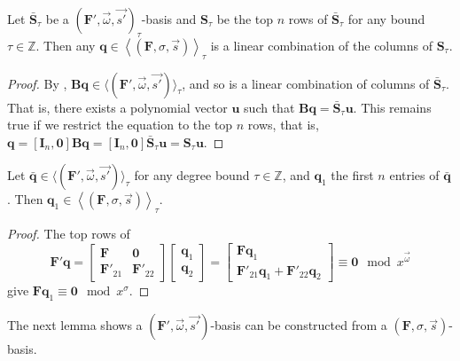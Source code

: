 \begin{cor}
\label{cor:linearCombinationOfFirstnRows}Let $\bar{\mathbf{S}}_{\tau}$
be a $(\mathbf{F}',\vec{\omega},\vec{s'})_{\tau}$-basis and $\mathbf{S}_{\tau}$
be the top $n$ rows of $\bar{\mathbf{S}}_{\tau}$ for any bound $\tau\in\mathbb{Z}$.
Then any $\mathbf{q}\in\left\langle \left(\mathbf{F},\sigma,\vec{s}\right)\right\rangle _{\tau}$
is a linear combination of the columns of $\mathbf{S}_{\tau}$.\end{cor}
\begin{proof}
By , $\mathbf{B}\mathbf{q}\in\langle(\mathbf{F}',\vec{\omega},\vec{s'})\rangle_{\tau}$,
and so is a linear combination of columns of $\bar{\mathbf{S}}_{\tau}$.
That is, there exists a polynomial vector $\mathbf{u}$ such that
$\mathbf{B}\mathbf{q}=\bar{\mathbf{S}}_{\tau}\mathbf{u}$. This remains
true if we restrict the equation to the top $n$ rows, that is, $\mathbf{q}=\left[\mathbf{I}_{n},\mathbf{0}\right]\mathbf{B}\mathbf{q}=\left[\mathbf{I}_{n},\mathbf{0}\right]\bar{\mathbf{S}}_{\tau}\mathbf{u}=\mathbf{S}_{\tau}\mathbf{u}$.\end{proof}
\begin{lem}
\label{lem:bqToqOrder}Let $\bar{\mathbf{q}}\in\langle(\mathbf{F}',\vec{\omega},\vec{s'})\rangle_{\tau}$
for any degree bound $\tau\in\mathbb{Z}$, and $\mathbf{q}_{1}$ the
first $n$ entries of $\mathbf{\bar{q}}$. Then $\mathbf{q}_{1}\in\left\langle \left(\mathbf{F},\sigma,\vec{s}\right)\right\rangle _{\tau}$.\end{lem}
\begin{proof}
The top rows of 
\[
\mathbf{F}'\mathbf{q}=\left[\begin{array}{cc}
\mathbf{F} & \mathbf{0}\\
\mathbf{F}'_{21} & \mathbf{F}'_{22}
\end{array}\right]\left[\begin{array}{c}
\mathbf{q}_{1}\\
\mathbf{q}_{2}
\end{array}\right]=\begin{bmatrix}\mathbf{F}\mathbf{q}_{1}\\
\mathbf{F}'_{21}\mathbf{q}_{1}+\mathbf{F}'_{22}\mathbf{q}_{2}
\end{bmatrix}\equiv\mathbf{0}\mod x^{\vec{\omega}}
\]
 give $\mathbf{F}\mathbf{q}_{1}\equiv\mathbf{0}\mod x^{\sigma}$. 
\end{proof}
The next lemma shows a $(\mathbf{F}',\vec{\omega},\vec{s'})$-basis
can be constructed from a $\left(\mathbf{F},\sigma,\vec{s}\right)$-basis.
